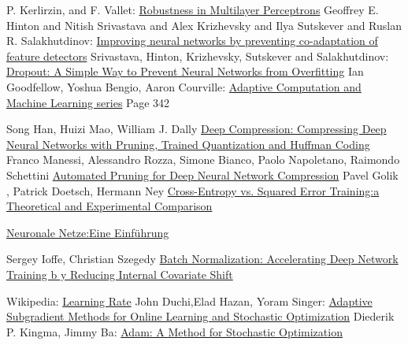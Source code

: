 \documentclass[12pt,a4paper]{scrartcl}
\numberwithin{equation}{section}
\begin{document}


\begin{thebibliography}{lem00}
	P. Kerlirzin, and F. Vallet: \href{ https://www.mitpressjournals.org/doi/abs/10.1162/neco.1993.5.3.473?journalCode=neco} {Robustness in Multilayer Perceptrons}
 	Geoffrey E. Hinton and Nitish Srivastava and Alex Krizhevsky and Ilya Sutskever and Ruslan R. Salakhutdinov: \href{https://arxiv.org/abs/1207.0580}{Improving neural networks by preventing co-adaptation of feature detectors}
 	Srivastava, Hinton, Krizhevsky, Sutskever and Salakhutdinov: \href{http://jmlr.org/papers/volume15/srivastava14a.old/srivastava14a.pdf}{Dropout: A Simple Way to Prevent Neural Networks from Overfitting}
Ian Goodfellow, Yoshua Bengio, Aaron Courville:
\href{https://www.amazon.com/Deep-Learning-Adaptive-Computation-Machine/dp/0262035618/ref=as_li_ss_tl?ieTF8&qid=1548018253&sr=8-3&keywords=deep+learning&linkCode=sl1&tag=inspiredalgor-20&linkId=49b3b1cce7e04bb3c9b99f2d878bf805&language=en_US}{Adaptive Computation and Machine Learning series} Page 342
 
	 Song Han, Huizi Mao, William J. Dally \href{https://arxiv.org/abs/1510.00149}{Deep Compression: Compressing Deep Neural Networks with Pruning, Trained Quantization and Huffman Coding}
      Franco Manessi, Alessandro Rozza, Simone Bianco, Paolo Napoletano, Raimondo Schettini \href{https://arxiv.org/abs/1712.01721}{Automated Pruning for Deep Neural Network Compression}
 	 Pavel Golik , Patrick Doetsch, Hermann Ney
 	\href{http://books.jackon.me/Cross-Entropy-vs-Squared-Error-Training-a-Theoretical-and-Experimental-Comparison.pdf}{Cross-Entropy vs. Squared Error Training:a Theoretical and Experimental Comparison}
 	
 	\href{http://www.neuronalesnetz.de/aktivitaet.html}{Neuronale Netze:Eine Einführung}
 	
	Sergey Ioffe, Christian Szegedy
 	\href{https://arxiv.org/pdf/1502.03167.pdf}{Batch Normalization: Accelerating Deep Network Training b
 		y
 		Reducing Internal Covariate Shift}

	Wikipedia:
		\href{https://en.wikipedia.org/wiki/Learning_rate}{Learning Rate}
		John Duchi,Elad Hazan, Yoram Singer:
		\href{http://www.jmlr.org/papers/volume12/duchi11a/duchi11a.pdf}{Adaptive Subgradient Methods for
			Online Learning and Stochastic Optimization}
		Diederik P. Kingma, Jimmy Ba:
		\href{https://arxiv.org/abs/1412.6980}{Adam: A Method for Stochastic Optimization}
		

\end{thebibliography}
\end{document}
